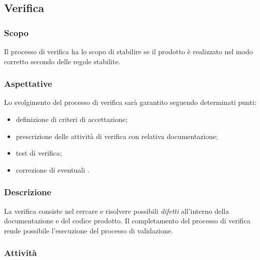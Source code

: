 \subsection{Verifica}

    \subsubsection{Scopo}
    
    Il processo di verifica ha lo scopo di stabilire se il prodotto è realizzato nel modo corretto secondo delle regole stabilite.
    
    \subsubsection{Aspettative}
    
    Lo svolgimento del processo di verifica sarà garantito seguendo determinati punti:
    
    \begin{itemize}
        \item definizione di criteri di accettazione;
	\item prescrizione delle attività di verifica con relativa documentazione;
	\item test di verifica;
	\item correzione di eventuali .
    \end{itemize}
    
    \subsubsection{Descrizione}
		La verifica consiste nel cercare e risolvere possibili \textit{difetti} all'interno della documentazione e del codice prodotto. Il completamento del processo di verifica rende possibile l'esecuzione del processo di validazione.
    \subsubsection{Attività}
